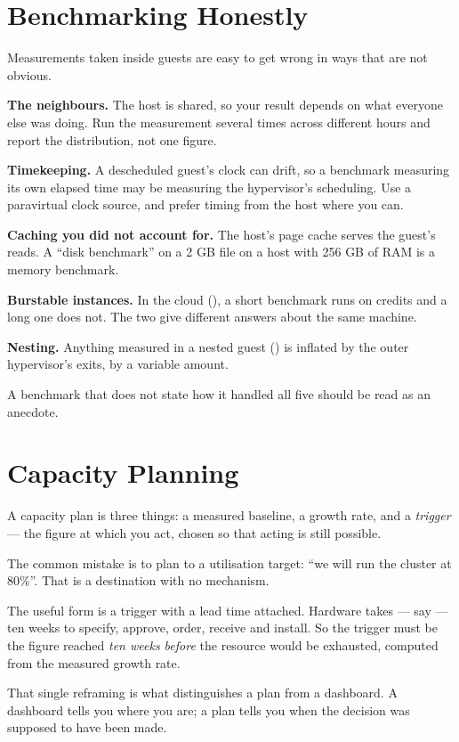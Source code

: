 \section{Benchmarking Honestly}

Measurements taken inside guests are easy to get wrong in ways that are not
obvious.

\begin{conceptbox}
\begin{tight}
  \item \textbf{The neighbours.} The host is shared, so your result depends on
        what everyone else was doing. Run the measurement several times across
        different hours and report the distribution, not one figure.
  \item \textbf{Timekeeping.} A descheduled guest's clock can drift, so a
        benchmark measuring its own elapsed time may be measuring the
        hypervisor's scheduling. Use a paravirtual clock source, and prefer
        timing from the host where you can.
  \item \textbf{Caching you did not account for.} The host's page cache serves
        the guest's reads. A ``disk benchmark'' on a 2 GB file on a host with
        256 GB of RAM is a memory benchmark.
  \item \textbf{Burstable instances.} In the cloud (), a short
        benchmark runs on credits and a long one does not. The two give
        different answers about the same machine.
  \item \textbf{Nesting.} Anything measured in a nested guest
        () is inflated by the outer hypervisor's exits, by a
        variable amount.
\end{tight}

\smallskip
A benchmark that does not state how it handled all five should be read as an
anecdote.
\end{conceptbox}

\section{Capacity Planning}

A capacity plan is three things: a measured baseline, a growth rate, and a
\emph{trigger} --- the figure at which you act, chosen so that acting is still
possible.

\begin{conceptbox}
The common mistake is to plan to a utilisation target: ``we will run the
cluster at 80\%''. That is a destination with no mechanism.

\smallskip
The useful form is a trigger with a lead time attached. Hardware takes --- say
--- ten weeks to specify, approve, order, receive and install. So the trigger
must be the figure reached \emph{ten weeks before} the resource would be
exhausted, computed from the measured growth rate.

\smallskip
That single reframing is what distinguishes a plan from a dashboard. A
dashboard tells you where you are; a plan tells you when the decision was
supposed to have been made.
\end{conceptbox}

